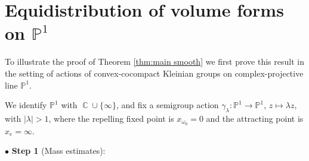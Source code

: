 \documentclass[12pt]{amsbook}%
\theoremstyle{definition}
\theoremstyle{remark}
\numberwithin{section}{chapter}
\numberwithin{subsection}{section}
\numberwithin{figure}{chapter}
\DeclareMathOperator{\C}{\mathbb{C}}
\def\bP{{\mathbb{P}}}
\def\cF{{\mathscr{F}}}
\def\sK{{\mathscr{K}}}
\def\xpair{{(x^+,x^-)}}
\def\la{\lambda}
\def\kap{}
\begin{document}
{{%




\section{Equidistribution of volume forms on $\bP^1$} \label{subsection_equidistrib_P1}

To illustrate the proof of Theorem \ref{thm:main smooth} we first prove this result in the setting of actions of convex-cocompact Kleinian groups on complex-projective line $\bP^1$. 

We identify $\bP^1$ with $\C \cup \{\infty\}$, 
and fix a semigroup action $\gamma_\la \colon \bP^1 \to \bP^1$,  $z \mapsto \lambda z$, with $|\lambda| > 1$, where the repelling fixed point is $x_{\omega_0}= 0$ and the attracting point is $x_{e}= \infty$.  
\smallskip 


$\bullet$ \textbf{Step 1} (Mass estimates):  
%



}}
\end{document}
